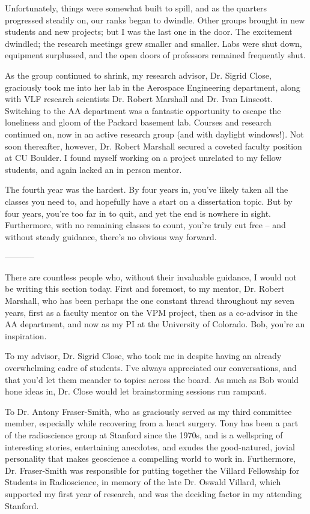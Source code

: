 Unfortunately, things were somewhat built to spill, and as the quarters progressed steadily on, our ranks began to dwindle. Other groups brought in new students and new projects; but I was the last one in the door. The excitement dwindled; the research meetings grew smaller and smaller. Labs were shut down, equipment surplussed, and the open doors of professors remained frequently shut. 

As the group continued to shrink, my research advisor, Dr. Sigrid Close, graciously took me into her lab in the Aerospace Engineering department, along with VLF research scientists Dr. Robert Marshall and Dr. Ivan Linscott. Switching to the AA department was a fantastic opportunity to escape the loneliness and gloom of the Packard basement lab. Courses and research continued on, now in an active research group (and with daylight windows!). Not soon thereafter, however, Dr. Robert Marshall secured a coveted faculty position at CU Boulder. I found myself working on a project unrelated to my fellow students, and again lacked an in person mentor.

The fourth year was the hardest. By four years in, you've likely taken all the classes you need to, and hopefully have a start on a dissertation topic. But by four years, you're too far in to quit, and yet the end is nowhere in sight. Furthermore, with no remaining classes to count, you're truly cut free -- and without steady guidance, there's no obvious way forward.

-----------

There are countless people who, without their invaluable guidance, I would not be writing this section today. First and foremost, to my mentor, Dr. Robert Marshall, who has been perhaps the one constant thread throughout my seven years, first as a faculty mentor on the VPM project, then as a co-advisor in the AA department, and now as my PI at the University of Colorado. Bob, you're an inspiration.

To my advisor, Dr. Sigrid Close, who took me in despite having an already overwhelming cadre of students. I've always appreciated our conversations, and that you'd let them meander to topics across the board. As much as Bob would hone ideas in, Dr. Close would let brainstorming sessions run rampant.

To Dr. Antony Fraser-Smith, who as graciously served as my third committee member, especially while recovering from a heart surgery. Tony has been a part of the radioscience group at Stanford since the 1970s, and is a wellspring of interesting stories, entertaining anecdotes, and exudes the good-natured, jovial personality that makes geoscience a compelling world to work in. Furthermore, Dr. Fraser-Smith was responsible for putting together the Villard Fellowship for Students in Radioscience, in memory of the late Dr. Oswald Villard, which supported my first year of research, and was the deciding factor in my attending Stanford. 

